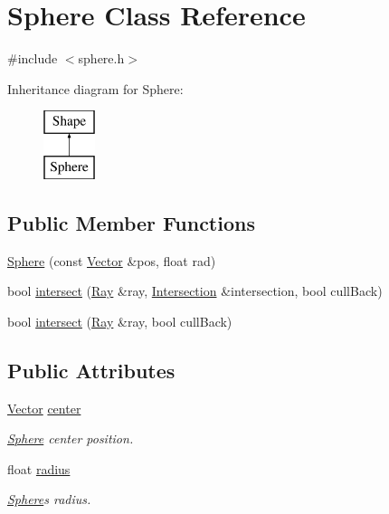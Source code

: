 \hypertarget{class_sphere}{}\section{Sphere Class Reference}
\label{class_sphere}


{\ttfamily \#include $<$sphere.\+h$>$}

Inheritance diagram for Sphere\+:\begin{figure}[H]
\begin{center}
\leavevmode
\includegraphics[height=2.000000cm]{class_sphere}
\end{center}
\end{figure}
\subsection*{Public Member Functions}
\begin{DoxyCompactItemize}
\item 
\mbox{\hyperlink{class_sphere_acdc6a785051367320ea2fbbb66769b1a}{Sphere}} (const \mbox{\hyperlink{struct_vector}{Vector}} \&pos, float rad)
\item 
bool \mbox{\hyperlink{class_sphere_ab4700cd65d2bba22863d0bee673e8bf3}{intersect}} (\mbox{\hyperlink{class_ray}{Ray}} \&ray, \mbox{\hyperlink{class_intersection}{Intersection}} \&intersection, bool cull\+Back)
\item 
bool \mbox{\hyperlink{class_sphere_a0ca2b62d692108272b9b64857965838b}{intersect}} (\mbox{\hyperlink{class_ray}{Ray}} \&ray, bool cull\+Back)
\end{DoxyCompactItemize}
\subsection*{Public Attributes}
\begin{DoxyCompactItemize}
\item 
\mbox{\label{class_sphere_ad8604838ba9a34188843f422afdc7a8e}} 
\mbox{\hyperlink{struct_vector}{Vector}} \mbox{\hyperlink{class_sphere_ad8604838ba9a34188843f422afdc7a8e}{center}}
\begin{DoxyCompactList}\small\item\em \mbox{\hyperlink{class_sphere}{Sphere}} center position. \end{DoxyCompactList}\item 
\mbox{\label{class_sphere_ae6f42f0da6679a2f0b4a22681ccccf38}} 
float \mbox{\hyperlink{class_sphere_ae6f42f0da6679a2f0b4a22681ccccf38}{radius}}
\begin{DoxyCompactList}\small\item\em \mbox{\hyperlink{class_sphere}{Sphere}}\textquotesingle{}s radius. \end{DoxyCompactList}\end{DoxyCompactItemize}



